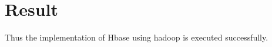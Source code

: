 \documentclass[a4paper,10pt]{article}
\begin{document}
\section{Result}
Thus the implementation of Hbase using hadoop is executed successfully.
\end{document}
